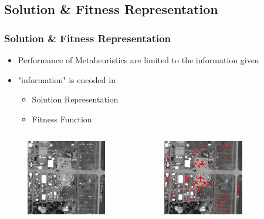 \documentclass{beamer}
\begin{document}
\subsection{Solution \& Fitness Representation}

\begin{frame}
\frametitle{Solution \& Fitness Representation}
	
	\begin{itemize}
		\item Performance of Metaheuristics are limited to the information given
		\item "information" is encoded in
		\begin{itemize}
			\item Solution Representation
			\item Fitness Function
		\end{itemize}
	\end{itemize}

	\begin{columns}[c]
	\begin{figure}
	\centering
		\includegraphics[width=35mm ]{resources/airplane-original-min.png}
	\end{figure}

	\begin{figure}
	\centering
		\includegraphics[width=35mm ]{resources/airplane-ground-truth-min.png}
	\end{figure}
	\end{columns}

\end{frame}
\end{document}
